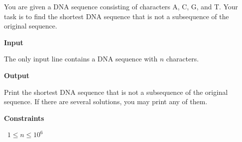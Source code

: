 You are given a DNA sequence consisting of characters A, C, G, and T.
Your task is to find the shortest DNA sequence that is not a subsequence of the original sequence.

\vspace{0.3cm}\noindent\textbf{Input}

The only input line contains a DNA sequence with $n$ characters.

\vspace{0.3cm}\noindent\textbf{Output}

Print the shortest DNA sequence that is not a subsequence of the original sequence. If there are several solutions, you may print any of them.

\vspace{0.3cm}\noindent\textbf{Constraints}

\textbullet\ $1 \le n \le 10^6$